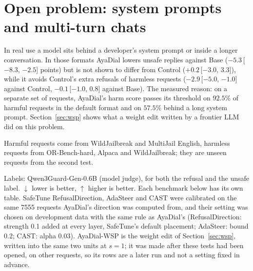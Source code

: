 \documentclass[10pt,a4paper]{article}
\begin{document}
\section{Open problem: system prompts and multi-turn chats}\label{sec:open}
In real use a model sits behind a developer's system prompt or inside a longer conversation. In those formats AyaDial lowers unsafe replies against Base ($-5.3$\,[$-8.3$, $-2.5$] points) but is not shown to differ from Control ($+0.2$\,[$-3.0$, $3.3$]), while it avoids Control's extra refusals of harmless requests ($-2.9$\,[$-5.0$, $-1.0$] against Control, $-0.1$\,[$-1.0$, $0.8$] against Base). The measured reason: on a separate set of requests, AyaDial's harm score passes its threshold on $92.5$\% of harmful requests in the default format and on $57.5$\% behind a long system prompt. Section~\ref{sec:wsp} shows what a weight edit written by a frontier LLM did on this problem.

Harmful requests come from WildJailbreak and MultiJail English, harmless requests from OR-Bench-hard, Alpaca and WildJailbreak; they are unseen requests from the second test.

Labels: Qwen3Guard-Gen-0.6B (model judge), for both the refusal and the unsafe label. $\downarrow$ lower is better, $\uparrow$ higher is better. Each benchmark below has its own table. SafeTune RefusalDirection, AdaSteer and CAST were calibrated on the same 7555 requests AyaDial's direction was computed from, and their setting was chosen on development data with the same rule as AyaDial's (RefusalDirection: strength 0.1 added at every layer, SafeTune's default placement; AdaSteer: bound 0.2; CAST: alpha 0.03). AyaDial-WSP is the weight edit of Section~\ref{sec:wsp}, written into the same two units at $s = 1$; it was made after these tests had been opened, on other requests, so its rows are a later run and not a setting fixed in advance.
\end{document}
